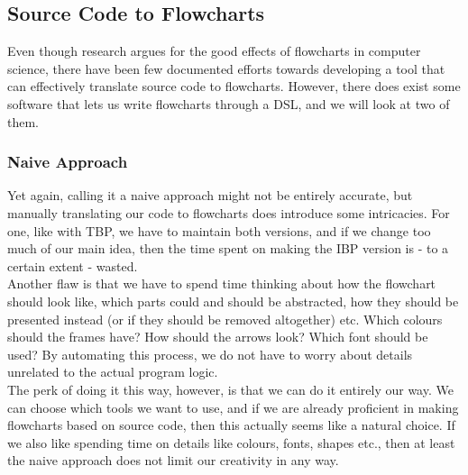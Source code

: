 

\subsection{Source Code to Flowcharts}

Even though research argues for the good effects of flowcharts in computer science, there have been few documented efforts towards developing a tool that can effectively translate source code to flowcharts. However, there does exist some software that lets us write flowcharts through a DSL, and we will look at two of them.

\subsubsection{Naive Approach}

Yet again, calling it a naive approach might not be entirely accurate, but manually translating our code to flowcharts does introduce some intricacies. For one, like with TBP, we have to maintain both versions, and if we change too much of our main idea, then the time spent on making the IBP version is - to a certain extent - wasted. \\

Another flaw is that we have to spend time thinking about how the flowchart should look like, which parts could and should be abstracted, how they should be presented instead (or if they should be removed altogether) etc. Which colours should the frames have? How should the arrows look? Which font should be used? By automating this process, we do not have to worry about details unrelated to the actual program logic. \\

The perk of doing it this way, however, is that we can do it entirely our way. We can choose which tools we want to use, and if we are already proficient in making flowcharts based on source code, then this actually seems like a natural choice. If we also like spending time on details like colours, fonts, shapes etc., then at least the naive approach does not limit our creativity in any way. \\


